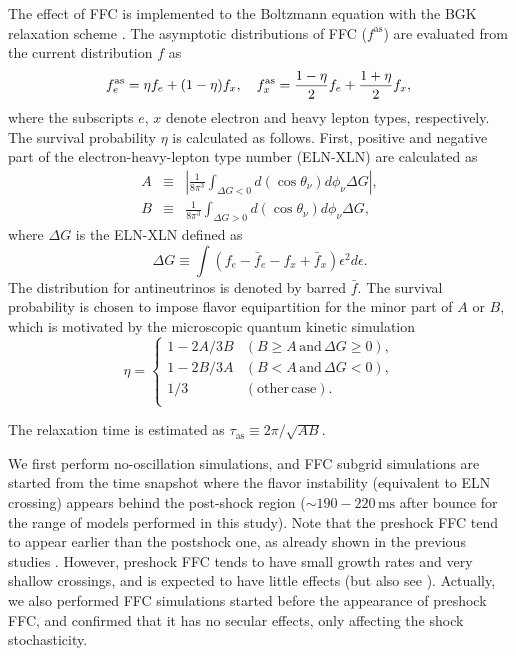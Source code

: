 \documentclass[
reprint,
superscriptaddress,
amsmath,amssymb,
aps,
prl
]{revtex4-2}
\begin{document}
The effect of FFC is implemented to the Boltzmann equation with the BGK relaxation scheme \cite{Nagakura2024PhRvD.109h3013N}.
The asymptotic distributions of FFC ($f^\mathrm{as}$) are evaluated from the current distribution $f$ as
\begin{equation}
f_e^\mathrm{as} = \eta f_e+(1-\eta)f_x, \quad
f_x^\mathrm{as} = \frac{1-\eta}{2} f_e+\frac{1+\eta}{2}f_x, \\
\end{equation}
where the subscripts $e$, $x$ denote electron and heavy lepton types, respectively.
The survival probability $\eta$ is calculated as follows.
First, positive and negative part of the electron-heavy-lepton type number (ELN-XLN) are calculated as
\begin{eqnarray}
A&\equiv&\left|\frac{1}{8\pi^3}\int_{\Delta G<0} d(\cos\theta_\nu)d\phi_\nu \Delta G\right|, \\
B&\equiv&\frac{1}{8\pi^3}\int_{\Delta G>0} d(\cos\theta_\nu)d\phi_\nu \Delta G,
\end{eqnarray}
where $\Delta G$ is the ELN-XLN defined as
\begin{equation}
\Delta G\equiv \int(f_e-\bar f_e - f_x + \bar f_x)\epsilon^2d\epsilon.
\end{equation}
The distribution for antineutrinos is denoted by barred $\bar f$.
The survival probability is chosen to impose flavor equipartition for the minor part of $A$ or $B$, which is motivated by the microscopic quantum kinetic simulation \cite{Zaizen2023PhRvD.107j3022Z,Xiong2023PhRvD.108f3003X}
\begin{equation}
\label{eq:BA1}
\eta = \left\{
\begin{array}{cc}
1-2A/3B & (B\ge A \,\mathrm{and}\, \Delta G\ge0), \\
1-2B/3A & (B<A \,\mathrm{and}\, \Delta G<0), \\
1/3 & (\mathrm{other\,case}). \\
\end{array}
\right.
\end{equation}

The relaxation time is estimated as $\tau_\mathrm{as} \equiv {2\pi}/{\sqrt{AB}}$.

We first perform no-oscillation simulations, and FFC subgrid simulations are started from the time snapshot where the flavor instability (equivalent to ELN crossing) appears behind the post-shock region ($\sim190-220\,\mathrm{ms}$ after bounce for the range of models performed in this study).
Note that the preshock FFC tend to appear earlier than the postshock one, as already shown in the previous studies \cite{Nagakura2021PhRvD.104h3025N,Akaho2024PhRvD.109b3012A}.
However, preshock FFC tends to have small growth rates and very shallow crossings, and is expected to have little effects \cite{Abbar2022JCAP...03..051A} (but also see \cite{Zaizen2021PhRvD.104h3035Z}).
Actually, we also performed FFC simulations started before the appearance of preshock FFC, and confirmed that it has no secular effects, only affecting the shock stochasticity.
\end{document}
